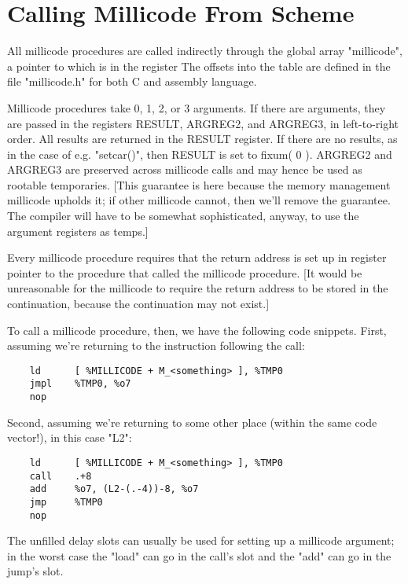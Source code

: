 \section{Calling Millicode From Scheme}

All millicode procedures are called indirectly through the global
array "millicode", a pointer to which is in the register %
The offsets into the table are defined in the file "millicode.h"
for both C and assembly language.

Millicode procedures take 0, 1, 2, or 3 arguments. If there are
arguments, they are passed in the registers RESULT, ARGREG2, and
ARGREG3, in left-to-right order. All results are returned in the
RESULT register.  If there are no results, as in the case of e.g.
"setcar()", then RESULT is set to fixum( 0 ). ARGREG2 and ARGREG3 are
preserved across millicode calls and may hence be used as rootable
temporaries. [This guarantee is here because the memory management
millicode upholds it; if other millicode cannot, then we'll remove the
guarantee. The compiler will have to be somewhat sophisticated,
anyway, to use the argument registers as temps.]

Every millicode procedure requires that the return address is set up
in register %
pointer to the procedure that called the millicode procedure.  [It
would be unreasonable for the millicode to require the return address
to be stored in the continuation, because the continuation may not
exist.]

To call a millicode procedure, then, we have the following code
snippets. First, assuming we're returning to the instruction
following the call:

\begin{verbatim}
    ld      [ %MILLICODE + M_<something> ], %TMP0
    jmpl    %TMP0, %o7
    nop
\end{verbatim}

Second, assuming we're returning to some other place (within the same
code vector!), in this case "L2":

\begin{verbatim}
    ld      [ %MILLICODE + M_<something> ], %TMP0
    call    .+8
    add     %o7, (L2-(.-4))-8, %o7
    jmp     %TMP0
    nop
\end{verbatim}

The unfilled delay slots can usually be used for setting up a millicode
argument; in the worst case the "load" can go in the call's slot and
the "add" can go in the jump's slot.


